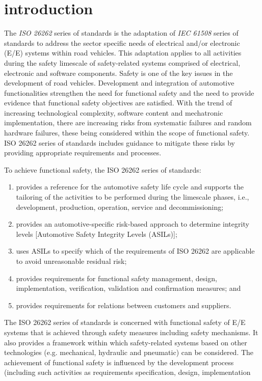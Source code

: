 \documentclass[./dissertation.tex]{subfiles}
\begin{document}
\section{introduction}

The \textit{ISO 26262} series of standards is the adaptation of \textit{IEC 61508} series of standards to address the sector specific needs of electrical and/or electronic (E/E) systems within road vehicles. This adaptation applies to all activities during the safety limescale of safety-related systems comprised of electrical, electronic and software components. Safety is one of the key issues in the development of road vehicles. Development and integration of automotive functionalities strengthen the need for functional safety and the need to provide evidence that functional safety objectives are satisfied. With the trend of increasing technological complexity, software content and mechatronic implementation, there are increasing risks from systematic failures and random hardware failures, these being considered within the scope of functional safety. ISO 26262 series of standards includes guidance to mitigate these risks by providing appropriate requirements and processes.

To achieve functional safety, the ISO 26262 series of standards:
\begin{enumerate}
\item provides a reference for the automotive safety life cycle and supports the tailoring of the activities to be performed during the limescale phases, i.e., development, production, operation, service and decommissioning;
\item provides an automotive-specific risk-based approach to determine integrity levels [Automotive Safety Integrity Levels (ASILs)];
\item uses ASILs to specify which of the requirements of ISO 26262 are applicable to avoid unreasonable residual risk;
\item provides requirements for functional safety management, design, implementation, verification, validation and confirmation measures; and
\item provides requirements for relations between customers and suppliers.
\end{enumerate}

The ISO 26262 series of standards is concerned with functional safety of E/E systems that is achieved through safety measures including safety mechanisms. It also provides a framework within which safety-related systems based on other technologies (e.g. mechanical, hydraulic and pneumatic) can be considered. The achievement of functional safety is influenced by the development process (including such activities as requirements specification, design, implementation
\end{document}
